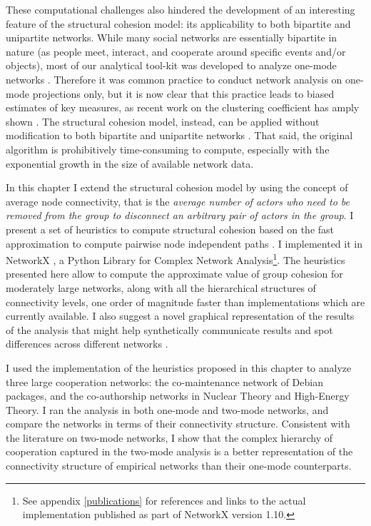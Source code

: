 These computational challenges also hindered the development of an interesting feature of the structural cohesion model: its applicability to both bipartite and unipartite networks. While many social networks are essentially bipartite in nature (as people meet, interact, and cooperate around specific events and/or objects), most of our analytical tool-kit was developed to analyze one-mode networks \citep*{latapy:2008}. Therefore it was common practice to conduct network analysis on one-mode projections only, but it is now clear that this practice leads to biased estimates of key measures, as recent work on the clustering coefficient has amply shown \citep{robins:2004,lind:2005,latapy:2008}. The structural cohesion model, instead, can be applied without modification to both bipartite and unipartite networks \citep*{white:2004}. That said, the original algorithm is prohibitively time-consuming to compute, especially with the exponential growth in the size of available network data. 

In this chapter I extend the structural cohesion model by using the concept of average node connectivity, that is the \emph{average number of actors who need to be removed from the group to disconnect an arbitrary pair of actors in  the group}. I present a set of heuristics to compute structural cohesion based on the fast approximation to compute pairwise node independent paths \citep{white:2001b}. I implemented it in NetworkX \citep{hagberg:2008}, a Python Library for Complex Network Analysis\footnote{See appendix \ref{publications} for references and links to the actual implementation published as part of NetworkX version 1.10.}. The heuristics presented here allow to compute the approximate value of group cohesion for moderately large networks, along with all the hierarchical structures of connectivity levels, one order of magnitude faster than implementations which are currently available. I also suggest a novel graphical representation of the results of the analysis that might help synthetically communicate results and spot differences across different networks \citep*{moody:2005}.

I used the implementation of the heuristics proposed in this chapter to analyze three large cooperation networks: the co-maintenance network of Debian packages, and the co-authorship networks in Nuclear Theory and High-Energy Theory. I ran the analysis in both one-mode and two-mode networks, and compare the networks in terms of their connectivity structure. Consistent with the literature on two-mode networks, I show that the complex hierarchy of cooperation captured in the two-mode analysis is a better representation of the connectivity structure of empirical networks than their one-mode counterparts.

